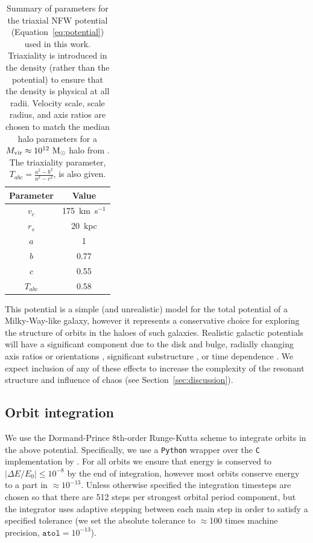 \begin{table}[ht]
\begin{center}
	\begin{tabular}{ c  c }
	         Parameter & Value\\\toprule
		$v_c$ & 175~km~s$^{-1}$\\
		$r_s$ & 20~kpc\\
		$a$ & 1\\
		$b$ & 0.77\\
		$c$ & 0.55\\
		\midrule
		$T_{abc}$ & 0.58\\
		\bottomrule
		\end{tabular}
	\caption{Summary of parameters for the triaxial NFW potential (Equation~\ref{eq:potential}) used in this work. Triaxiality is introduced in the density (rather than the potential) to ensure that the density is physical at all radii. Velocity scale, scale radius, and axis ratios are chosen to match the median halo parameters for a $M_{\rm vir} \approx 10^{12}~\mathrm{M}_\odot$ halo from \citep{jing02}. The triaxiality parameter, $T_{abc} = \frac{a^2 - b^2}{a^2 - c^2}$, is also given. \label{tbl:potential}}
\end{center}
\end{table}

This potential is a simple (and unrealistic) model for the total potential of a Milky-Way-like galaxy, however it represents a conservative choice for exploring the structure of orbits in the haloes of such galaxies. Realistic galactic potentials will have a significant component due to the disk and bulge, radially changing axis ratios or orientations \citep[e.g.,][]{romanowsky98, kazantzidis04,debattista08,veraciro11,butsky15}, significant substructure \citep{moore98,zemp09}, or time dependence \citep[either from bulk rotation, mass growth, mergers, etc.; see, e.g.,][]{bailin05}. We expect inclusion of any of these effects to increase the complexity of the resonant structure and influence of chaos (see Section~\ref{sec:discussion}). 

\subsection{Orbit integration}\label{sec:integration}

We use the Dormand-Prince 8th-order Runge-Kutta scheme \citep{prince81} to integrate orbits in the above potential. Specifically, we use a \texttt{Python} wrapper over the \texttt{C} implementation by \cite{hairer93}. For all orbits we ensure that energy is conserved to $|\Delta E/E_0| \leq 10^{-8}$ by the end of integration, however most orbits conserve energy to a part in $\approx$$10^{-13}$. Unless otherwise specified the integration timesteps are chosen so that there are 512 steps per strongest orbital period component, but the integrator uses adaptive stepping between each main step in order to satisfy a specified tolerance (we set the absolute tolerance to $\approx$100 times machine precision, $\texttt{atol} = 10^{-13}$). 


